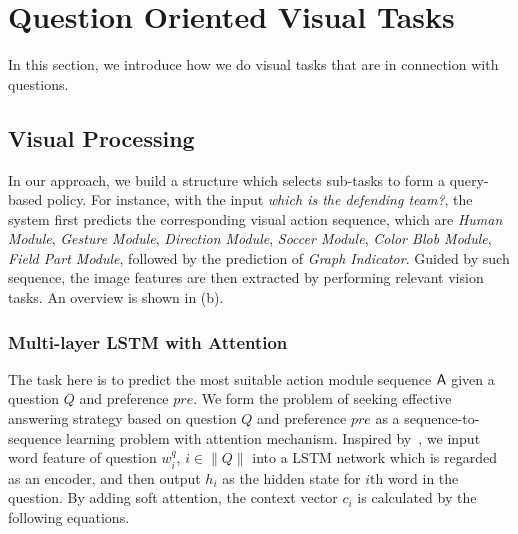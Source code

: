 \section{Question Oriented Visual Tasks}
\label{sec-reinforcement-learning}
In this section, we introduce how we do visual tasks that are in connection with questions. 




\subsection{Visual Processing}

In our approach, we build a structure which selects sub-tasks to form a query-based policy. For instance, with the input \textit{which is the defending team?}, the system first predicts the corresponding visual action sequence, which are \textit{Human Module}, \textit{Gesture Module}, \textit{Direction Module}, \textit{Soccer Module}, \textit{Color Blob Module}, \textit{Field Part Module}, followed by the prediction of \textit{Graph Indicator}. Guided by such sequence, the image features are then extracted by performing relevant vision tasks. An overview is shown in  (b).  

\label{sec-visual-processing}

\subsubsection{Multi-layer LSTM with Attention}
\label{sec-LSTM}
\hspace{\parindent}The task here is to predict the most suitable action module sequence ${\mathsf{A}}$ given a question $Q$ and preference $pre$. We form the problem of seeking effective answering strategy based on question $Q$ and preference $pre$ as a sequence-to-sequence learning problem with attention mechanism. Inspired by~\cite{Bahdanau2016}, we input word feature of question $w_i^q$, $i\in\|Q\|$ into a LSTM network which is regarded as an encoder, and then output $h_i$ as the hidden state for $i$th word in the question. By adding soft attention, the context vector $c_i$ is calculated by the following equations.


